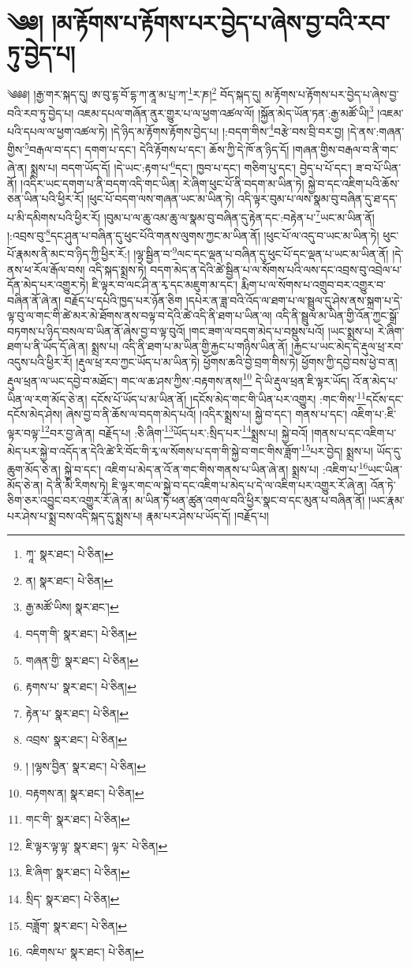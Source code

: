 \setcounter{footnote}{0} 
\chapter{༄༅། །མ་རྟོགས་པ་རྟོགས་པར་བྱེད་པ་ཞེས་བྱ་བའི་རབ་ཏུ་བྱེད་པ།}༄༅༅། །རྒྱ་གར་སྐད་དུ། ཨ་བུ་དྷ་བོ་དྷ་ཀ་ནཱ་མ་པྲ་ཀ་\footnote{ཀཱ་  སྣར་ཐང་།  པེ་ཅིན། }ར་ཎ།\footnote{ན།  སྣར་ཐང་།  པེ་ཅིན། } བོད་སྐད་དུ། མ་རྟོགས་པ་རྟོགས་པར་བྱེད་པ་ཞེས་བྱ་བའི་རབ་ཏུ་བྱེད་པ། འཇམ་དཔལ་གཞོན་ནུར་གྱུར་པ་ལ་ཕྱག་འཚལ་ལོ། །སྐྱོན་མེད་ཡོན་ཏན་:རྒྱ་མཚོ་ཡི།\footnote{རྒྱ་མཚོ་ཡིས།  སྣར་ཐང་། } །འཇམ་པའི་དཔལ་ལ་ཕྱག་འཚལ་ཏེ། །དེ་ཉིད་མ་རྟོགས་རྟོགས་བྱེད་པ། །:བདག་གིས་\footnote{བདག་གི་  སྣར་ཐང་།  པེ་ཅིན། }བརྩེ་བས་བྲི་བར་བྱ། །དེ་ནས་:གཞན་གྱིས་\footnote{གཞན་གྱི་  སྣར་ཐང་།  པེ་ཅིན། }བརྒལ་བ་དང་། དགག་པ་དང་། དེའི་རྟོགས་པ་དང་། ཆོས་ཀྱི་དེ་ཁོ་ན་ཉིད་དོ། །གཞན་གྱིས་བརྒལ་བ་ནི་གང་ཞེ་ན། སྨྲས་པ། བདག་ཡོད་དོ། །དེ་ཡང་:རྟག་པ་\footnote{རྟགས་པ་  སྣར་ཐང་།  པེ་ཅིན། }དང་། ཁྱབ་པ་དང་། གཅིག་པུ་དང་། བྱེད་པ་པོ་དང་། ཟ་བ་པོ་ཡིན་ནོ། །འདིར་ཡང་དགག་པ་ནི་བདག་འདི་གང་ཡིན། རེ་ཞིག་ཕུང་པོ་ནི་བདག་མ་ཡིན་ཏེ། སྐྱེ་བ་དང་འཇིག་པའི་ཆོས་ཅན་ཡིན་པའི་ཕྱིར་རོ། །ཕུང་པོ་བདག་ལས་གཞན་ཡང་མ་ཡིན་ཏེ། འདི་ལྟར་བུམ་པ་ལས་སྣམ་བུ་བཞིན་དུ་ཐ་དད་པ་མི་དམིགས་པའི་ཕྱིར་རོ། །བུམ་པ་ལ་ཆུ་འམ་ཆུ་ལ་སྣམ་བུ་བཞིན་དུ་རྟེན་དང་:བརྟེན་པ་\footnote{རྟེན་པ་  སྣར་ཐང་།  པེ་ཅིན། }ཡང་མ་ཡིན་ནོ། །:འབྲས་བུ་\footnote{འབྲས་  སྣར་ཐང་།  པེ་ཅིན། }དང་ཤུན་པ་བཞིན་དུ་ཕུང་པོའི་གནས་ལུགས་ཀྱང་མ་ཡིན་ནོ། །ཕུང་པོ་ལ་འདུ་བ་ཡང་མ་ཡིན་ཏེ། ཕུང་པོ་རྣམས་ནི་མང་བ་ཉིད་ཀྱི་ཕྱིར་རོ:། །ལྷ་སྦྱིན་བ་\footnote{། །ལྷས་བྱིན་  སྣར་ཐང་།  པེ་ཅིན། }ལང་དང་ལྡན་པ་བཞིན་དུ་ཕུང་པོ་དང་ལྡན་པ་ཡང་མ་ཡིན་ནོ། །དེ་ནས་ཕ་རོལ་རྒོལ་བས། འདི་སྐད་སྨྲས་ཏེ། བདག་མེད་ན་དེའི་ཚེ་སྦྱིན་པ་ལ་སོགས་པའི་ལས་དང་འབྲས་བུ་འབྲེལ་པ་དོན་མེད་པར་འགྱུར་ཏེ། ཇི་ལྟར་བ་ལང་ཤི་ན་རྭ་དང་མཇུག་མ་དང་། རྨིག་པ་ལ་སོགས་པ་འགྲུབ་བར་འགྱུར་བ་བཞིན་ནོ་ཞེ་ན། བརྗོད་པ་དཔེའི་ཁྱད་པར་ཉོན་ཅིག །དཔེར་ན་ཟླ་བའི་འོད་ལ་ཐག་པ་ལ་སྦྲུལ་དུ་ཤེས་ནས་སྐྲག་པ་དེ་ལྟ་བུ་ལ་གང་གི་ཚེ་མར་མེ་ཐོགས་ནས་བལྟ་བ་དེའི་ཚེ་འདི་ནི་ཐག་པ་ཡིན་ལ། འདི་ནི་སྦྲུལ་མ་ཡིན་གྱི་འོན་ཀྱང་སྒྲོ་བཏགས་པ་ཉིད་བསལ་བ་ཡིན་ནོ་ཞེས་བྱ་བ་ལྟ་བུའོ། །གང་ཟག་ལ་བདག་མེད་པ་བསྡུས་པའོ། །ཡང་སྨྲས་པ། རེ་ཞིག་ཐག་པ་ནི་ཡོད་དོ་ཞེ་ན། སྨྲས་པ། འདི་ནི་ཐག་པ་མ་ཡིན་གྱི་རྐྱང་པ་གཉིས་ཡིན་ནོ། །རྐྱང་པ་ཡང་མེད་དེ་རྡུལ་ཕྲ་རབ་འདུས་པའི་ཕྱིར་རོ། །རྡུལ་ཕྲ་རབ་ཀྱང་ཡོད་པ་མ་ཡིན་ཏེ། ཕྱོགས་ཆའི་བྱེ་བྲག་གིས་ཏེ། ཕྱོགས་ཀྱི་དབྱེ་བས་ཕྱེ་བ་ན། རྡུལ་ཕྲན་ལ་ཡང་དབྱེ་བ་མཐོང་། གང་ལ་ཆ་ཤས་ཀྱིས་:བརྟགས་ནས།\footnote{བརྟགས་ན།  སྣར་ཐང་།  པེ་ཅིན། } དེ་ཡི་རྡུལ་ཕྲན་ཇི་ལྟར་ཡོད། འོ་ན་མེད་པ་ཡིན་ལ་རག་མོད་ཅེ་ན། དངོས་པོ་ཡོད་པ་མ་ཡིན་ནོ། །དངོས་མེད་གང་གི་ཡིན་པར་འགྱུར། :གང་གིས་\footnote{གང་གི་  སྣར་ཐང་།  པེ་ཅིན། }དངོས་དང་དངོས་མེད་ཤེས། ཞེས་བྱ་བ་ནི་ཆོས་ལ་བདག་མེད་པའོ། །འདིར་སྨྲས་པ། སྐྱེ་བ་དང་། གནས་པ་དང་། འཇིག་པ་:ཇི་ལྟར་བལྟ་\footnote{ཇི་ལྟར་ལྟ་ལྟ་  སྣར་ཐང་། ལྟར་  པེ་ཅིན། }བར་བྱ་ཞེ་ན། བརྗོད་པ། :ཅི་ཞིག་\footnote{ཇི་ཞིག་  སྣར་ཐང་།  པེ་ཅིན། }ཡོད་པར་:སྲིད་པར་\footnote{སྲིད་  སྣར་ཐང་།  པེ་ཅིན། }སྨྲས་པ། སྐྱེ་བའོ། །གནས་པ་དང་འཇིག་པ་མེད་པར་སྐྱེ་བ་འདོད་ན་དེའི་ཚེ་རི་བོང་གི་རྭ་ལ་སོགས་པ་དག་གི་སྐྱེ་བ་གང་གིས་ཟློག་\footnote{བཟློག་  སྣར་ཐང་།  པེ་ཅིན། }པར་བྱེད། སྨྲས་པ། ཡོད་དུ་ཆུག་མོད་ཅེ་ན། སྐྱེ་བ་དང་། འཇིག་པ་མེད་ན་འོ་ན་གང་གིས་གནས་པ་ཡིན་ཞེ་ན། སྨྲས་པ། :འཇིག་པ་\footnote{འཇིགས་པ་  སྣར་ཐང་།  པེ་ཅིན། }ཡང་ཡིན་མོད་ཅེ་ན། དེ་ནི་མི་རིགས་ཏེ། ཇི་ལྟར་གང་ལ་སྐྱེ་བ་དང་འཇིག་པ་མེད་པ་དེ་ལ་འཇིག་པར་འགྱུར་རོ་ཞེ་ན། འོན་ཏེ་ཅིག་ཅར་འབྱུང་བར་འགྱུར་རོ་ཞེ་ན། མ་ཡིན་ཏེ་ཕན་ཚུན་འགལ་བའི་ཕྱིར་སྣང་བ་དང་མུན་པ་བཞིན་ནོ། །ཡང་རྣམ་པར་ཤེས་པ་སྨྲ་བས་འདི་སྐད་དུ་སྨྲས་པ། རྣམ་པར་ཤེས་པ་ཡོད་དོ། །བརྗོད་པ། 